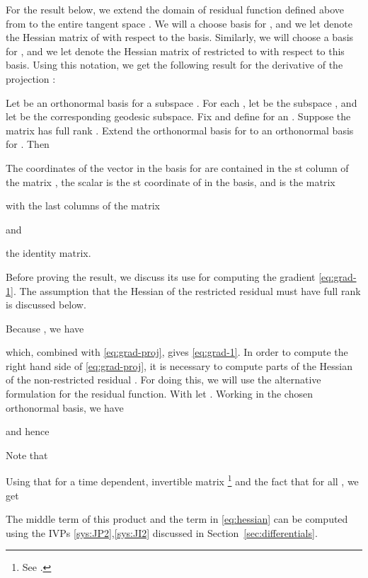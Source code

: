 \documentclass[final]{svjour3}
\begin{document}
For the result below, we extend the domain of residual function 
defined above from  to the entire tangent space .
We will a choose basis for , and we let 
denote the Hessian matrix of  with respect to the basis. Similarly,
we will choose a basis for , and
we let  denote the Hessian matrix of 
restricted to  with respect to this basis. Using this notation, we 
get the following result for the derivative of the projection :
\begin{proposition}
    Let  be an orthonormal basis for a subspace . 
    For each , let  be the subspace , and
    let  be the corresponding geodesic subspace. 
    Fix  and define  for an
    . Suppose the matrix  has full rank . Extend the
    orthonormal basis 
    for  to an orthonormal basis for 
    . Then
    
    The coordinates of the vector 
    in the basis for  are contained in the st column of 
    the matrix , the scalar 
    is the st coordinate of  in the basis, and
     is the matrix
    
    with  the last  columns of 
    the matrix
    
    and
    
    the identity matrix.
    \label{prop:grad-proj}
\end{proposition}
Before proving the result, we discuss its use for computing the gradient
\eqref{eq:grad-1}. 
The assumption that the Hessian of the restricted residual  
must have full rank is discussed below.

Because , 
we have

which, combined with \eqref{eq:grad-proj}, gives \eqref{eq:grad-1}.
In order to compute the right hand side of \eqref{eq:grad-proj}, it is necessary to
compute parts of the Hessian of the non-restricted residual .
For doing this, we will use the alternative formulation 
 for the residual function.
With  let .
Working in the chosen orthonormal basis, we have

and hence

Note that

Using that  for a time dependent,
invertible matrix \footnote{
See \cite[Eq. (2)]{decell_derivative_1974}.
} and the fact that
 for all , we get

The middle term of this product and the term 
 in \eqref{eq:hessian}
can be computed using the IVPs \eqref{sys:JP2},\eqref{sys:JI2} discussed in
Section~\ref{sec:differentials}.
\end{document}
